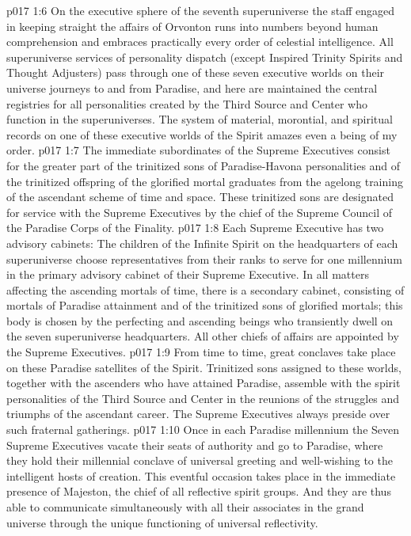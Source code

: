 \vs p017 1:6 On the executive sphere of the seventh superuniverse the staff engaged in keeping straight the affairs of Orvonton runs into numbers beyond human comprehension and embraces practically every order of celestial intelligence. All superuniverse services of personality dispatch (except Inspired Trinity Spirits and Thought Adjusters) pass through one of these seven executive worlds on their universe journeys to and from Paradise, and here are maintained the central registries for all personalities created by the Third Source and Center who function in the superuniverses. The system of material, morontial, and spiritual records on one of these executive worlds of the Spirit amazes even a being of my order.
\vs p017 1:7 The immediate subordinates of the Supreme Executives consist for the greater part of the trinitized sons of Paradise\hyp{}Havona personalities and of the trinitized offspring of the glorified mortal graduates from the agelong training of the ascendant scheme of time and space. These trinitized sons are designated for service with the Supreme Executives by the chief of the Supreme Council of the Paradise Corps of the Finality.
\vs p017 1:8 Each Supreme Executive has two advisory cabinets: The children of the Infinite Spirit on the headquarters of each superuniverse choose representatives from their ranks to serve for one millennium in the primary advisory cabinet of their Supreme Executive. In all matters affecting the ascending mortals of time, there is a secondary cabinet, consisting of mortals of Paradise attainment and of the trinitized sons of glorified mortals; this body is chosen by the perfecting and ascending beings who transiently dwell on the seven superuniverse headquarters. All other chiefs of affairs are appointed by the Supreme Executives.
\vs p017 1:9 \pc From time to time, great conclaves take place on these Paradise satellites of the Spirit. Trinitized sons assigned to these worlds, together with the ascenders who have attained Paradise, assemble with the spirit personalities of the Third Source and Center in the reunions of the struggles and triumphs of the ascendant career. The Supreme Executives always preside over such fraternal gatherings.
\vs p017 1:10 Once in each Paradise millennium the Seven Supreme Executives vacate their seats of authority and go to Paradise, where they hold their millennial conclave of universal greeting and well\hyp{}wishing to the intelligent hosts of creation. This eventful occasion takes place in the immediate presence of Majeston, the chief of all reflective spirit groups. And they are thus able to communicate simultaneously with all their associates in the grand universe through the unique functioning of universal reflectivity.
